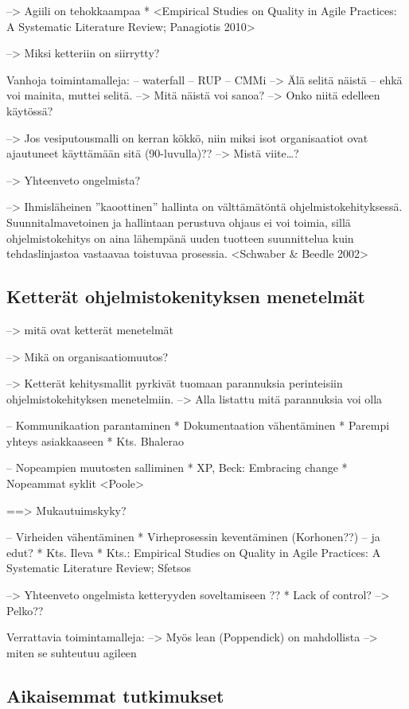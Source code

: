 --> Agiili on tehokkaampaa
  * <Empirical Studies on Quality in Agile Practices: A Systematic Literature Review; Panagiotis 2010>

--> Miksi ketteriin on siirrytty?

Vanhoja toimintamalleja:
-- waterfall
-- RUP
-- CMMi
--> Älä selitä näistä -- ehkä voi mainita, muttei selitä.
--> Mitä näistä voi sanoa? --> Onko niitä edelleen käytössä?

--> Jos vesiputousmalli on kerran kökkö, niin miksi isot organisaatiot ovat
ajautuneet käyttämään sitä (90-luvulla)?? --> Mistä viite\ldots?

--> Yhteenveto ongelmista?

--> Ihmisläheinen ''kaoottinen'' hallinta on välttämätöntä ohjelmistokehityksessä.
Suunnitalmavetoinen ja hallintaan perustuva ohjaus ei voi toimia, sillä
ohjelmistokehitys on aina lähempänä uuden tuotteen suunnittelua kuin
tehdaslinjastoa vastaavaa toistuvaa prosessia. <Schwaber \& Beedle 2002>


\subsection{Ketterät ohjelmistokenityksen menetelmät}

--> mitä ovat ketterät menetelmät

--> Mikä on organisaatiomuutos?

--> Ketterät kehitysmallit pyrkivät tuomaan parannuksia perinteisiin
ohjelmistokehityksen menetelmiin. --> Alla listattu mitä parannuksia voi olla

-- Kommunikaation parantaminen
  * Dokumentaation vähentäminen
  * Parempi yhteys asiakkaaseen
  * Kts. Bhalerao

-- Nopeampien muutosten salliminen
  * XP, Beck: Embracing change
  * Nopeammat syklit <Poole>

==> Mukautuimskyky?

-- Virheiden vähentäminen
  * Virheprosessin keventäminen (Korhonen??) -- ja edut?
  * Kts. Ileva
  * Kts.: Empirical Studies on Quality in Agile Practices: A Systematic Literature Review; Sfetsos

--> Yhteenveto ongelmista ketteryyden soveltamiseen ??
  * Lack of control? --> Pelko??

Verrattavia toimintamalleja:
--> Myös lean (Poppendick) on mahdollista
--> miten se suhteutuu agileen

\subsection{Aikaisemmat tutkimukset}

